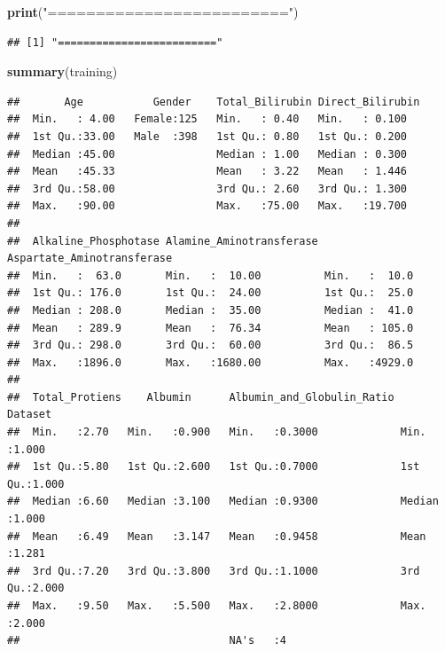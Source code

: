 \documentclass[]{article}
\newenvironment{Shaded}{\begin{snugshade}}{\end{snugshade}}
\newcommand{\KeywordTok}[1]{\textcolor[rgb]{0.13,0.29,0.53}{\textbf{#1}}}
\newcommand{\NormalTok}[1]{#1}
\newcommand{\StringTok}[1]{\textcolor[rgb]{0.31,0.60,0.02}{#1}}
\begin{document}
\begin{Shaded}
\begin{Highlighting}[]
\KeywordTok{print}\NormalTok{(}\StringTok{"========================="}\NormalTok{)}
\end{Highlighting}
\end{Shaded}

\begin{verbatim}
## [1] "========================="
\end{verbatim}

\begin{Shaded}
\begin{Highlighting}[]
\KeywordTok{summary}\NormalTok{(training)}
\end{Highlighting}
\end{Shaded}

\begin{verbatim}
##       Age           Gender    Total_Bilirubin Direct_Bilirubin
##  Min.   : 4.00   Female:125   Min.   : 0.40   Min.   : 0.100  
##  1st Qu.:33.00   Male  :398   1st Qu.: 0.80   1st Qu.: 0.200  
##  Median :45.00                Median : 1.00   Median : 0.300  
##  Mean   :45.33                Mean   : 3.22   Mean   : 1.446  
##  3rd Qu.:58.00                3rd Qu.: 2.60   3rd Qu.: 1.300  
##  Max.   :90.00                Max.   :75.00   Max.   :19.700  
##                                                               
##  Alkaline_Phosphotase Alamine_Aminotransferase Aspartate_Aminotransferase
##  Min.   :  63.0       Min.   :  10.00          Min.   :  10.0            
##  1st Qu.: 176.0       1st Qu.:  24.00          1st Qu.:  25.0            
##  Median : 208.0       Median :  35.00          Median :  41.0            
##  Mean   : 289.9       Mean   :  76.34          Mean   : 105.0            
##  3rd Qu.: 298.0       3rd Qu.:  60.00          3rd Qu.:  86.5            
##  Max.   :1896.0       Max.   :1680.00          Max.   :4929.0            
##                                                                          
##  Total_Protiens    Albumin      Albumin_and_Globulin_Ratio    Dataset     
##  Min.   :2.70   Min.   :0.900   Min.   :0.3000             Min.   :1.000  
##  1st Qu.:5.80   1st Qu.:2.600   1st Qu.:0.7000             1st Qu.:1.000  
##  Median :6.60   Median :3.100   Median :0.9300             Median :1.000  
##  Mean   :6.49   Mean   :3.147   Mean   :0.9458             Mean   :1.281  
##  3rd Qu.:7.20   3rd Qu.:3.800   3rd Qu.:1.1000             3rd Qu.:2.000  
##  Max.   :9.50   Max.   :5.500   Max.   :2.8000             Max.   :2.000  
##                                 NA's   :4
\end{verbatim}
\end{document}
